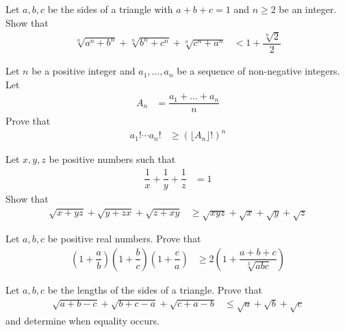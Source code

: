 \documentclass{subfile}
\begin{document}
		\begin{problem}
			Let $a,b,c$ be the sides of a triangle with $a+b+c=1$ and $n\geq2$ be an integer. Show that
				\begin{align*}
					\sqrt[n]{a^{n}+b^{n}}+\sqrt[n]{b^{n}+c^{n}}+\sqrt[n]{c^{n}+a^{n}}
						& < 1+\dfrac{\sqrt[n]{2}}{2}
				\end{align*}
		\end{problem}
	
		\begin{problem}
			Let $n$ be a positive integer and $a_{1},\ldots,a_{n}$ be a sequence of non-negative integers. Let
				\begin{align*}
					A_{n}
						& = \dfrac{a_{1}+\ldots+a_{n}}{n}
				\end{align*}
			Prove that
				\begin{align*}
					a_{1}!\cdots a_{n}!
						& \geq (\lfloor A_{n}\rfloor!)^{n}
				\end{align*}
		\end{problem}
	
		\begin{problem}
			Let $x,y,z$ be positive numbers such that
				\begin{align*}
					\dfrac{1}{x}+\dfrac{1}{y}+\dfrac{1}{z}
						& = 1
				\end{align*}
			Show that
				\begin{align*}
					\sqrt{x+yz}+\sqrt{y+zx}+\sqrt{z+xy}
						& \geq\sqrt{xyz}+\sqrt{x}+\sqrt{y}+\sqrt{z}
				\end{align*}
		\end{problem}
	
		\begin{problem}
			Let $a,b,c$ be positive real numbers. Prove that
				\begin{align*}
					\left(1+\dfrac{a}{b}\right)\left(1+\dfrac{b}{c}\right)\left(1+\dfrac{c}{a}\right)
						& \geq 2\left(1+\dfrac{a+b+c}{\sqrt[3]{abc}}\right)
				\end{align*}
		\end{problem}
	
		\begin{problem}
			Let $a,b,c$ be the lengths of the sides of a triangle. Prove that
				\begin{align*}
					\sqrt{a+b-c}+\sqrt{b+c-a}+\sqrt{c+a-b}
						& \leq \sqrt{a}+\sqrt{b}+\sqrt{c}
				\end{align*}
			and determine when equality occurs.
		\end{problem}
	
\end{document}
